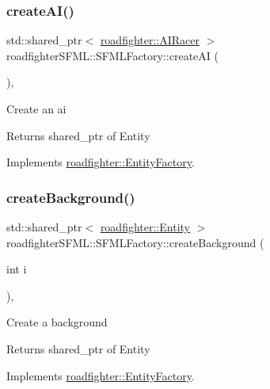 \subsubsection{\texorpdfstring{create\+A\+I()}{createAI()}}
{\footnotesize\ttfamily std\+::shared\+\_\+ptr$<$ \hyperlink{classroadfighter_1_1AIRacer}{roadfighter\+::\+A\+I\+Racer} $>$ roadfighter\+S\+F\+M\+L\+::\+S\+F\+M\+L\+Factory\+::create\+AI (\begin{DoxyParamCaption}{ }\end{DoxyParamCaption})\hspace{0.3cm}{\ttfamily [override]}, {\ttfamily [virtual]}}

Create an ai \begin{DoxyReturn}{Returns}
shared\+\_\+ptr of Entity 
\end{DoxyReturn}


Implements \hyperlink{classroadfighter_1_1EntityFactory_ae50d1b8cbf0b63dfbedca775781fbda0}{roadfighter\+::\+Entity\+Factory}.

\mbox{\label{classroadfighterSFML_1_1SFMLFactory_a18a78a7113edf49647f727105329f605}} 
\subsubsection{\texorpdfstring{create\+Background()}{createBackground()}}
{\footnotesize\ttfamily std\+::shared\+\_\+ptr$<$ \hyperlink{classroadfighter_1_1Entity}{roadfighter\+::\+Entity} $>$ roadfighter\+S\+F\+M\+L\+::\+S\+F\+M\+L\+Factory\+::create\+Background (\begin{DoxyParamCaption}\item[{int}]{i }\end{DoxyParamCaption})\hspace{0.3cm}{\ttfamily [override]}, {\ttfamily [virtual]}}

Create a background \begin{DoxyReturn}{Returns}
shared\+\_\+ptr of Entity 
\end{DoxyReturn}


Implements \hyperlink{classroadfighter_1_1EntityFactory_ab3586917a6ef9d3a92b825f908132e02}{roadfighter\+::\+Entity\+Factory}.

